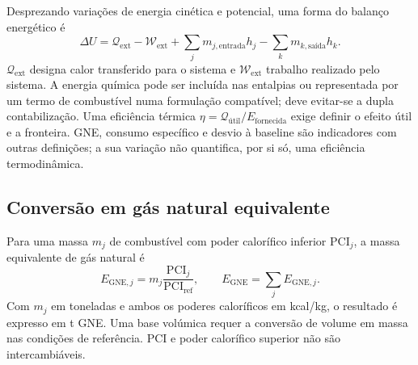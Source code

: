 Desprezando variações de energia cinética e potencial, uma forma do balanço energético é
\begin{equation}
\Delta U=\mathcal Q_{\mathrm{ext}}-\mathcal W_{\mathrm{ext}}
+\sum_j m_{j,\mathrm{entrada}}h_j-\sum_k m_{k,\mathrm{saída}}h_k.
\label{eq:mat-balanco-energia}
\end{equation}
$\mathcal Q_{\mathrm{ext}}$ designa calor transferido para o sistema e $\mathcal W_{\mathrm{ext}}$ trabalho realizado pelo sistema. A energia química pode ser incluída nas entalpias ou representada por um termo de combustível numa formulação compatível; deve evitar-se a dupla contabilização. Uma eficiência térmica $\eta=\mathcal Q_{\mathrm{útil}}/E_{\mathrm{fornecida}}$ exige definir o efeito útil e a fronteira. GNE, consumo específico e desvio à baseline são indicadores com outras definições; a sua variação não quantifica, por si só, uma eficiência termodinâmica.


\subsection{Conversão em gás natural equivalente}
\label{sec:mat-gne}
 Para uma massa $m_j$ de combustível com poder calorífico inferior $\mathrm{PCI}_j$, a massa equivalente de gás natural é
\begin{equation}
E_{\mathrm{GNE},j}=m_j\frac{\mathrm{PCI}_j}{\mathrm{PCI}_{\mathrm{ref}}},
\qquad E_{\mathrm{GNE}}=\sum_j E_{\mathrm{GNE},j}.
\label{eq:mat-gne-combustivel}
\end{equation}
Com $m_j$ em toneladas e ambos os poderes caloríficos em kcal/kg, o resultado é expresso em t GNE. Uma base volúmica requer a conversão de volume em massa nas condições de referência. PCI e poder calorífico superior não são intercambiáveis.

